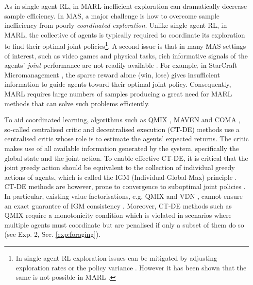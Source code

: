 \documentclass{article}
\begin{document}
As in single agent RL, in MARL inefficient exploration can dramatically decrease sample efficiency. In MAS, a major challenge is how to overcome sample inefficiency from poorly \textit{coordinated exploration}. Unlike single agent RL, in MARL, the collective of agents is typically required to coordinate its exploration to find their optimal joint policies\footnote{In single agent RL exploration issues can be mitigated by adjusting
exploration rates or the policy variance \cite{tijsma2016comparing}. However it has been shown that the same is not possible in MARL \cite{mahajan2019maven}.}.
A second issue is that in many MAS settings of interest, such as video games and physical tasks, rich informative signals of the agents' \textit{joint} performance are not readily available \cite{hosu2016playing}. For example, in StarCraft Micromanagement \cite{samvelyan2019starcraft}, the sparse reward alone (win, lose) gives insufficient information to guide agents toward their optimal joint policy. Consequently, MARL requires large numbers of samples producing a great need for MARL methods that can solve such problems efficiently. 


To aid coordinated learning, algorithms such as QMIX \cite{rashid2018qmix}, MAVEN \cite{mahajan2019maven} and COMA \cite{foerster2018counterfactual}, so-called centralised critic and decentralised execution (CT-DE) methods use a centralised critic whose role is to estimate the agents' expected returns. The critic makes use of all available information generated by the system, specifically the global state and the joint action. 
To enable effective CT-DE, it is critical that the joint greedy action should be equivalent to the collection of individual greedy actions of agents, which is called the IGM (Individual-Global-Max) principle \cite{son2019qtran}.  
CT-DE methods are however, prone to convergence to suboptimal joint policies \cite{wang2020towards}. In particular, existing value factorisations, e.g. QMIX and VDN \cite{sunehag2017value}, cannot ensure an exact guarantee of IGM consistency \cite{wang2020qplex}. Moreover, CT-DE methods such as QMIX require a monotonicity condition which is violated in scenarios where multiple agents must coordinate but are penalised
if only a subset of them do so (see Exp. 2, Sec. \ref{exp:foraging}).  
\end{document}
